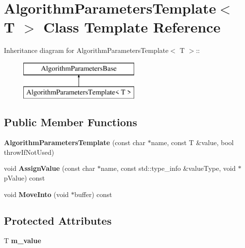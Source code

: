 \hypertarget{class_algorithm_parameters_template}{
\section{AlgorithmParametersTemplate$<$ T $>$ Class Template Reference}
\label{class_algorithm_parameters_template}
}
Inheritance diagram for AlgorithmParametersTemplate$<$ T $>$::\begin{figure}[H]
\begin{center}
\leavevmode
\includegraphics[height=2cm]{class_algorithm_parameters_template}
\end{center}
\end{figure}
\subsection*{Public Member Functions}
\begin{DoxyCompactItemize}
\item 
\hypertarget{class_algorithm_parameters_template_a4479d41996d566f22be2234523ad6c4a}{
{\bfseries AlgorithmParametersTemplate} (const char $\ast$name, const T \&value, bool throwIfNotUsed)}
\label{class_algorithm_parameters_template_a4479d41996d566f22be2234523ad6c4a}

\item 
\hypertarget{class_algorithm_parameters_template_aa8cb1ed4c64e8c526f9889e9789b5822}{
void {\bfseries AssignValue} (const char $\ast$name, const std::type\_\-info \&valueType, void $\ast$pValue) const }
\label{class_algorithm_parameters_template_aa8cb1ed4c64e8c526f9889e9789b5822}

\item 
\hypertarget{class_algorithm_parameters_template_a4fa11a3bebbfec8eda8f31e2aef583ea}{
void {\bfseries MoveInto} (void $\ast$buffer) const }
\label{class_algorithm_parameters_template_a4fa11a3bebbfec8eda8f31e2aef583ea}

\end{DoxyCompactItemize}
\subsection*{Protected Attributes}
\begin{DoxyCompactItemize}
\item 
\hypertarget{class_algorithm_parameters_template_a589c66787b2dfcb34ebe138a0ad6d1cb}{
T {\bfseries m\_\-value}}
\label{class_algorithm_parameters_template_a589c66787b2dfcb34ebe138a0ad6d1cb}

\end{DoxyCompactItemize}
